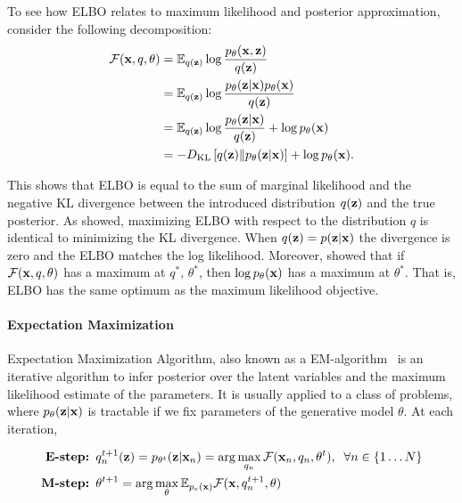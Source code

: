 To see how ELBO relates to maximum likelihood and posterior approximation,  consider the following decomposition:
\begin{equation}
\begin{aligned}
    \mathcal{F}({\mathbf{x}}, q, \theta) &= \mathbb{E}_{q({\mathbf{z}})}\log  \frac{p_{\theta}({\mathbf{x}},{\mathbf{z}})}{q({\mathbf{z}})} \\
    & = \mathbb{E}_{q({\mathbf{z}})}\log  \frac{p_{\theta}({\mathbf{z}}|{\mathbf{x}})p_{\theta}({\mathbf{x}})}{q({\mathbf{z}})} \\
    & = \mathbb{E}_{q({\mathbf{z}})}\log  \frac{p_{\theta}({\mathbf{z}}|{\mathbf{x}})}{q({\mathbf{z}})} +  \log p_{\theta}({\mathbf{x}})\\
    & = - D_{\mathrm{KL}}\left[q({\mathbf{z}})\|p_{\theta}({\mathbf{z}}|{\mathbf{x}})\right] + \log p_{\theta}({\mathbf{x}}).\\
\end{aligned}
\end{equation}

This shows that ELBO is equal to the sum of marginal likelihood and the negative KL divergence between the introduced distribution $q({\mathbf{z}})$ and the true posterior.
As \citet{neal1998view} showed,  maximizing ELBO with respect to the distribution $q$ is identical to minimizing the KL divergence. When $q({\mathbf{z}}) = p({\mathbf{z}}|{\mathbf{x}})$ the divergence is zero and the ELBO matches the log likelihood.
Moreover, \citet{neal1998view} showed that if $\mathcal{F}({\mathbf{x}}, q, \theta) $ has a maximum at $q^*, \, \theta^*$, then $\log p_{\theta}({\mathbf{x}})$ has a maximum at $\theta^*$. That is, ELBO has the same optimum as the maximum likelihood objective. 

\paragraph{Expectation Maximization}
Expectation Maximization Algorithm, also known as a EM-algorithm~\citep{dempster1977maximum} is an iterative algorithm to infer posterior over the latent variables and the maximum likelihood estimate of the parameters.
It is usually applied to a class of problems, where $p_{\theta}({\mathbf{z}}|{\mathbf{x}})$ is tractable if we fix parameters of the generative model $\theta$. At each iteration, 

\begin{equation}
\begin{aligned}
    \text{\textbf{E-step:  }} &q^{t+1}_n({\mathbf{z}}) = p_{\theta^t}({\mathbf{z}}|{\mathbf{x}}_n) = \arg\max_{q_n} \mathcal{F}({\mathbf{x}}_n, q_n, \theta^t),\;\;\forall n \in \{1\dots N\}\\
    \text{\textbf{M-step:  }} &\theta^{t+1} = \arg\max_{\theta} \mathbb{E}_{p_e({\mathbf{x}})}\mathcal{F}({\mathbf{x}}, q^{t+1}_n, \theta)\\
\end{aligned}
\end{equation}


